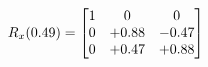 \documentclass[preview]{standalone}
\begin{document}
\begin{align*}
\special{dvisvgm:raw <g id='unique000'>}R_{x}(0.49) = \begin{bmatrix}1 & 0 & 0 \\0 & +0.88 & -0.47 \\0 & +0.47 & +0.88\end{bmatrix}\special{dvisvgm:raw </g>}
\end{align*}
\end{document}
